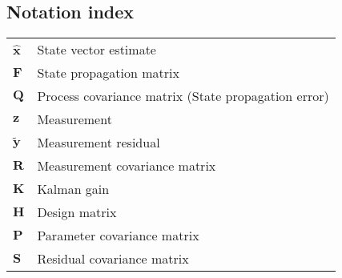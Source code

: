 \documentclass[12pt]{article}
\begin{document}
\newpage
\begin{appendices}

\section{Notation index}
\begin{tabular}{ll}
$\hat{\mathbf{x}}$   & State vector estimate \\
$\mathbf{F}$         & State propagation matrix \\
$\mathbf{Q}$         & Process covariance matrix (State propagation error) \\
$\mathbf{z}$         & Measurement \\
$\tilde{\mathbf{y}}$ & Measurement residual \\
$\mathbf{R}$         & Measurement covariance matrix \\
$\mathbf{K}$         & Kalman gain \\
$\mathbf{H}$         & Design matrix \\
$\mathbf{P}$         & Parameter covariance matrix \\
$\mathbf{S}$         & Residual covariance matrix \\
\end{tabular}

\end{appendices}
\end{document}
